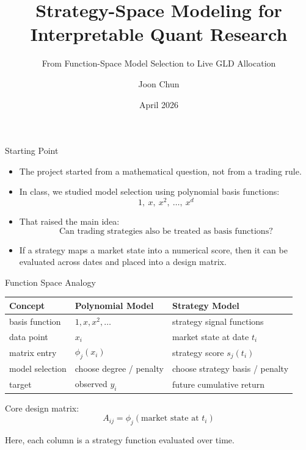 \documentclass[aspectratio=169]{beamer}
\title{Strategy-Space Modeling for Interpretable Quant Research}
\subtitle{From Function-Space Model Selection to Live GLD Allocation}
\author{Joon Chun}
\date{April 2026}
\begin{document}
\begin{frame}
  \titlepage
\end{frame}

\begin{frame}{Starting Point}
  \begin{itemize}
    \item The project started from a mathematical question, not from a trading rule.
    \item In class, we studied model selection using polynomial basis functions:
    \[
      1,\ x,\ x^2,\ \dots,\ x^d
    \]
    \item That raised the main idea:
    \[
      \text{Can trading strategies also be treated as basis functions?}
    \]
    \item If a strategy maps a market state into a numerical score, then it can be evaluated across dates and placed into a design matrix.
  \end{itemize}
\end{frame}

\begin{frame}{Function Space Analogy}
  \small
  \begin{tabular}{lll}
    \toprule
    Concept & Polynomial Model & Strategy Model \\
    \midrule
    basis function & \(1, x, x^2, \dots\) & strategy signal functions \\
    data point & \(x_i\) & market state at date \(t_i\) \\
    matrix entry & \(\phi_j(x_i)\) & strategy score \(s_j(t_i)\) \\
    model selection & choose degree / penalty & choose strategy basis / penalty \\
    target & observed \(y_i\) & future cumulative return \\
    \bottomrule
  \end{tabular}

  \vspace{0.8em}
  Core design matrix:
  \[
    A_{ij} = \phi_j(\text{market state at } t_i)
  \]

  \vspace{0.4em}
  Here, each column is a strategy function evaluated over time.
\end{frame}
\end{document}
